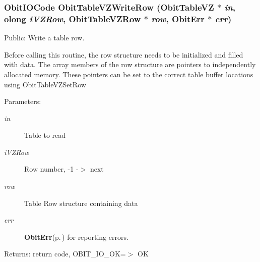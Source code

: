\subsubsection{\setlength{\rightskip}{0pt plus 5cm}Obit\-IOCode Obit\-Table\-VZWrite\-Row ({\bf Obit\-Table\-VZ} $\ast$ {\em in}, {\bf olong} {\em i\-VZRow}, {\bf Obit\-Table\-VZRow} $\ast$ {\em row}, {\bf Obit\-Err} $\ast$ {\em err})}\label{ObitTableVZ_8c_a24}


Public: Write a table row. 

Before calling this routine, the row structure needs to be initialized and filled with data. The array members of the row structure are pointers to independently allocated memory. These pointers can be set to the correct table buffer locations using Obit\-Table\-VZSet\-Row \begin{Desc}
\item[Parameters:]
\begin{description}
\item[{\em in}]Table to read \item[{\em i\-VZRow}]Row number, -1 -$>$ next \item[{\em row}]Table Row structure containing data \item[{\em err}]{\bf Obit\-Err}{\rm (p.\,\pageref{structObitErr})} for reporting errors. \end{description}
\end{Desc}
\begin{Desc}
\item[Returns:]return code, OBIT\_\-IO\_\-OK=$>$ OK \end{Desc}
